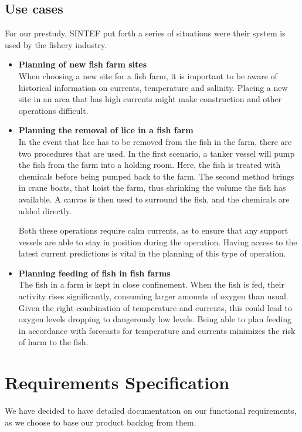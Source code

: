 \documentclass[11pt,a4paper,titlepage,oneside]{report}
\begin{document}
  \subsection{Use cases}
	For our prestudy, SINTEF put forth a series of situations were their system is used by the fishery industry. 
	\begin{itemize}
		\item \textbf{Planning of new fish farm sites} \\
		When choosing a new site for a fish farm, it is important to be aware of historical information on currents, temperature and salinity. Placing a new site in an area that has high currents might make construction and other operations difficult.
		\item \textbf{Planning the removal of lice in a fish farm} \\
		In the event that lice has to be removed from the fish in the farm, there are two procedures that are used. In the first scenario, a tanker vessel will pump the fish from the farm into a holding room. Here, the fish is treated with chemicals before being pumped back to the farm. The second method brings in crane boats, that hoist the farm, thus shrinking the volume the fish has available. A canvas is then used to surround the fish, and the chemicals are added directly. 

		Both these operations require calm currents, as to ensure that any support vessels are able to stay in position during the operation. Having access to the latest current predictions is vital in the planning of this type of operation.
		\item \textbf{Planning feeding of fish in fish farms} \\
		The fish in a farm is kept in close confinement. When the fish is fed, their activity rises significantly, consuming larger amounts of oxygen than usual. Given the right combination of temperature and currents, this could lead to oxygen levels dropping to dangerously low levels. Being able to plan feeding in accordance with forecasts for temperature and currents minimizes the risk of harm to the fish.
	\end{itemize}

\section{Requirements Specification}
\label{reqspec}
We have decided to have detailed documentation on our functional requirements, as we choose to base our product backlog from them.
\end{document}

